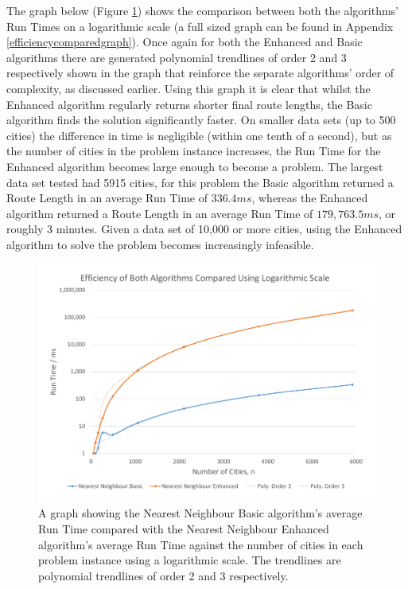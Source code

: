\documentclass[conference,backref=page]{acmsiggraph}
\begin{document}
The graph below (Figure \ref{efficiencycomparedcolumngraph}) shows the comparison between both the algorithms' Run Times on a logarithmic scale (a full sized graph can be found in Appendix \ref{efficiencycomparedgraph}). Once again for both the Enhanced and Basic algorithms there are generated polynomial trendlines of order 2 and 3 respectively shown in the graph that reinforce the separate algorithms' order of complexity, as discussed earlier. Using this graph it is clear that whilst the Enhanced algorithm regularly returns shorter final route lengths, the Basic algorithm finds the solution significantly faster. On smaller data sets (up to 500 cities) the difference in time is negligible (within one tenth of a second), but as the number of cities in the problem instance increases, the Run Time for the Enhanced algorithm becomes large enough to become a problem. The largest data set tested had 5915 cities, for this problem the Basic algorithm returned a Route Length in an average Run Time of $336.4ms$, whereas the Enhanced algorithm returned a Route Length in an average Run Time of $179,763.5ms$, or roughly 3 minutes. Given a data set of 10,000 or more cities, using the Enhanced algorithm to solve the problem becomes increasingly infeasible. 

\begin{figure}[h]
	\includegraphics[width=\columnwidth]{images/efficiency_compared_column.pdf}
	\caption{A graph showing the Nearest Neighbour Basic algorithm's average Run Time compared with the Nearest Neighbour Enhanced algorithm's average Run Time against the number of cities in each problem instance using a logarithmic scale. The trendlines are polynomial trendlines of order 2 and 3 respectively.}
	\label{efficiencycomparedcolumngraph}
\end{figure}
\end{document}
